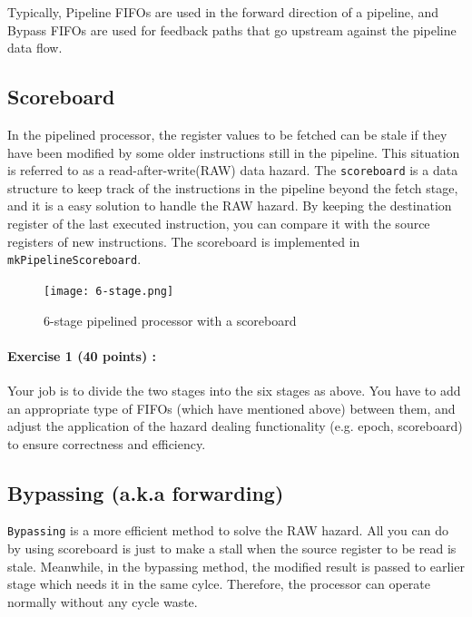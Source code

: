 \documentclass{article}
\begin{document}
Typically, Pipeline FIFOs are used in the forward direction of a pipeline, and
Bypass FIFOs are used for feedback paths that go upstream against the pipeline data flow.

\newpage
\subsection{Scoreboard}

In the pipelined processor, the register values to be fetched can be stale 
if they have been modified by some older instructions still in the pipeline.
This situation is referred to as a read-after-write(RAW) data hazard.
The \texttt{scoreboard} is a data structure to keep track of the instructions
in the pipeline beyond the fetch stage, and it is a easy solution to handle the RAW hazard.
By keeping the destination register of the last executed instruction, you can compare it
with the source registers of new instructions. The scoreboard is implemented
in \texttt{mkPipelineScoreboard}.

\begin{figure}[htbp]
	\begin{center}
		\texttt{[image: 6-stage.png]}
		\caption{6-stage pipelined processor with a scoreboard}
		\label{fig:2pipe_proc}
	\end{center}
\end{figure}

\noindent \paragraph{\bf Exercise 1 (40 points) :} Your job is to divide the two stages into the 
six stages as above. You have to add an appropriate type of FIFOs (which have mentioned above) between them, 
and adjust the application of the hazard dealing functionality (e.g. epoch, scoreboard) to ensure 
correctness and efficiency.

\newpage
\subsection{Bypassing (a.k.a forwarding)}

\texttt{Bypassing} is a more efficient method to solve the RAW hazard. All you can do by using
scoreboard is just to make a stall when the source register to be read is stale.
Meanwhile, in the bypassing method, the modified result is passed to earlier stage which needs
it in the same cylce. Therefore, the processor can operate normally without any cycle waste.
\end{document}
